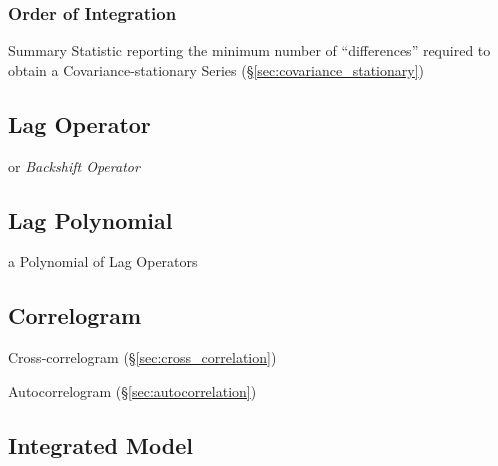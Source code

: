 \subsubsection{Order of Integration}\label{sec:order_of_integration}

Summary Statistic reporting the minimum number of ``differences'' required to
obtain a Covariance-stationary Series (\S\ref{sec:covariance_stationary})



\subsection{Lag Operator}\label{sec:lag_operator}

or \emph{Backshift Operator}



\subsection{Lag Polynomial}\label{sec:lag_polynomial}

a Polynomial of Lag Operators



\subsection{Correlogram}\label{sec:correlogram}

Cross-correlogram (\S\ref{sec:cross_correlation})

Autocorrelogram (\S\ref{sec:autocorrelation})



\subsection{Integrated Model}\label{sec:integrated_model}

